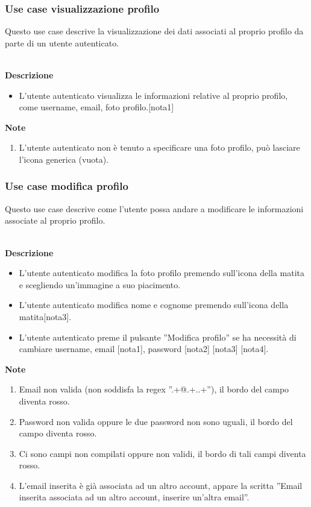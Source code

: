 \documentclass[a4paper,12pt]{article}
\begin{document}
\subsubsection*{Use case visualizzazione profilo}

Questo use case descrive la visualizzazione dei dati associati al proprio profilo da parte di un utente autenticato.

\textbf{\\Descrizione}
\begin{itemize} \setlength\itemsep{0.01em}
\item L'utente autenticato visualizza le informazioni relative al proprio profilo, come username, email, foto profilo.[nota1]
\end{itemize}

\textbf{Note}
\begin{enumerate} \setlength\itemsep{0.01em}
\item L'utente autenticato non è tenuto a specificare una foto profilo, può lasciare l'icona generica (vuota).
\end{enumerate}

\subsubsection*{Use case modifica profilo}

Questo use case descrive come l'utente possa andare a modificare le informazioni associate al proprio profilo.

\textbf{\\Descrizione}
\begin{itemize} \setlength\itemsep{0.01em}
\item L'utente autenticato modifica la foto profilo premendo sull'icona della matita e scegliendo un'immagine a suo piacimento.
\item L'utente autenticato modifica nome e cognome premendo sull'icona della matita[nota3].
\item L'utente autenticato preme il pulsante ''Modifica profilo'' se ha necessità di cambiare username, email [nota1], password [nota2] [nota3] [nota4].
\end{itemize}

\textbf{Note}
\begin{enumerate} \setlength\itemsep{0.01em}
\item Email non valida (non soddisfa la regex ''.+@.+..+''), il bordo del campo diventa rosso.
\item Password non valida oppure le due password non sono uguali, il bordo del campo diventa rosso.
\item Ci sono campi non compilati oppure non validi, il bordo di tali campi diventa rosso.
\item L'email inserita è già associata ad un altro account, appare la scritta ''Email inserita associata ad un altro account, inserire un'altra email''.
\end{enumerate}
\end{document}
